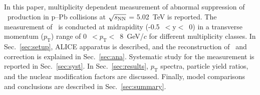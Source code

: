 In this paper, multiplicity dependent measurement of abnormal suppression of \fzero~production in p--Pb collisions at $\sqrt{s_{\rm NN}}$ = 5.02~TeV is reported. The measurement of \fzero~is conducted at midrapidity (-0.5~$<\mathrm{y}<$~0) in a transverse momentum ($p_{\mathrm{T}}$) range of 0~$<p_{\mathrm{T}}<$~8~GeV/$c$ for different multiplicity classes. In Sec.~\ref{sec:setup}, ALICE apparatus is described, and the reconstruction of \fzero~and correction is explained in Sec.~\ref{sec:ana}. Systematic study for the measurement is reported in Sec.~\ref{sec:syst}. In Sec.~\ref{sec:results}, $p_{\mathrm{T}}$ spectra, particle yield ratios, and the nuclear modification factors are discussed. Finally, model comparisons and conclusions are described in Sec.~\ref{sec:summary}.

\label{sec:intro}



